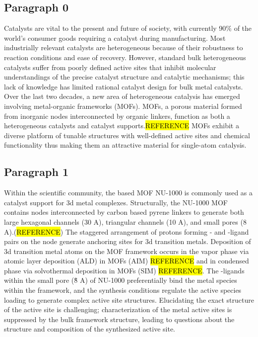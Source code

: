 \documentclass[journal=jctcce,manuscript=article]{achemso}
\begin{document}
\subsection{Paragraph 0}
 Catalysts are vital to the present and future of society, with currently 90\% of the world's consumer goods requiring a catalyst during manufacturing.\cite{Hagen2015} Most industrially relevant catalysts are heterogeneous because of their robustness to reaction conditions and ease of recovery. However, standard bulk heterogeneous catalysts suffer from poorly defined active sites that inhibit molecular understandings of the precise catalyst structure and catalytic mechanisms; this lack of knowledge has limited rational catalyst design for bulk metal catalysts. Over the last two decades, a new area of heterogeneous catalysis has emerged involving metal-organic frameworks (MOFs). MOFs, a porous material formed from inorganic nodes interconnected by organic linkers, function as both a heterogeneous catalysts and catalyst supports.\hl{REFERENCE} MOFs exhibit a diverse platform of tunable structures with well-defined active sites and chemical functionality thus making them an attractive material for single-atom catalysis. 


\subsection{Paragraph 1}
Within the scientific community, the  based MOF NU-1000 is commonly used as a catalyst support for 3d metal complexes. Structurally, the NU-1000 MOF contains  nodes interconnected by carbon based pyrene linkers to generate both large hexagonal channels (30 A), triangular channels (10 A), and small pores (8 A).(\hl{REFERENCE}) The staggered arrangement of protons forming - and -ligand pairs on the node generate anchoring sites for 3d transition metals.\cite{Planas2014} Deposition of 3d transition metal atoms on the MOF framework occurs in the vapor phase via atomic layer deposition (ALD) in MOFs (AIM) \hl{REFERENCE} and in condensed phase via solvothermal deposition in MOFs (SIM) \hl{REFERENCE}. The -ligands within the small pore (\~8 A) of NU-1000 preferentially bind the metal species within the framework,\cite{Gallington2016,Rimoldi2017} and the synthesis conditions regulate the active species loading to generate complex active site structures.\cite{Kim2015} Elucidating the exact structure of the active site is challenging; characterization of the metal active sites is suppressed by the bulk framework structure, leading to questions about the structure and composition of the synthesized active site.
\end{document}
